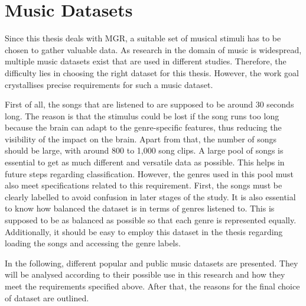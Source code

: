 \chapter{Music Datasets}\label{chapter:music_datasets}
\acresetall
  Since this thesis deals with \ac{MGR}, a suitable set of musical stimuli has to be chosen to gather valuable data. As research in the domain of music is widespread, multiple music datasets exist that are used in different studies. Therefore, the difficulty lies in choosing the right dataset for this thesis. However, the work goal crystallises precise requirements for such a music dataset. \par
  First of all, the songs that are listened to are supposed to be around 30 seconds long. The reason is that the stimulus could be lost if the song runs too long because the brain can adapt to the genre-specific features, thus reducing the visibility of the impact on the brain. Apart from that, the number of songs should be large, with around 800 to 1,000 song clips. A large pool of songs is essential to get as much different and versatile data as possible. This helps in future steps regarding classification. However, the genres used in this pool must also meet specifications related to this requirement. First, the songs must be clearly labelled to avoid confusion in later stages of the study. It is also essential to know how balanced the dataset is in terms of genres listened to. This is supposed to be as balanced as possible so that each genre is represented equally. Additionally, it should be easy to employ this dataset in the thesis regarding loading the songs and accessing the genre labels. \par
  In the following, different popular and public music datasets are presented. They will be analysed according to their possible use in this research and how they meet the requirements specified above. After that, the reasons for the final choice of dataset are outlined.\par

